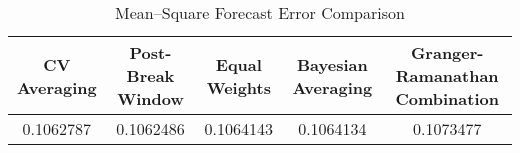 \newpage
\begin{sidewaystable}
\centering
\caption{Mean--Square Forecast Error Comparison}
\begin{tabular}{ccccc} \hline
\textbf{CV Averaging} & \textbf{Post-Break Window} & \textbf{Equal Weights} & \textbf{Bayesian Averaging} & \textbf{Granger-Ramanathan Combination}\\ \hline
0.1062787 & 0.1062486 & 0.1064143 & 0.1064134 & 0.1073477 \\ \hline
\end{tabular}
\end{sidewaystable}